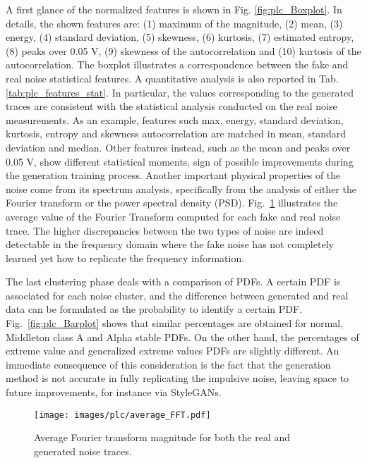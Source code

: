 A first glance of the normalized features is shown in Fig. \ref{fig:plc_Boxplot}. In details, the shown features are: (1) maximum of the magnitude, (2) mean, (3) energy, (4) standard deviation, (5) skewness, (6) kurtosis, (7) estimated entropy, (8) peaks over 0.05 V, (9) skewness of the autocorrelation and (10) kurtosis of the autocorrelation. The boxplot illustrates a correspondence between the fake and real noise statistical features. A quantitative analysis is also reported in Tab. \ref{tab:plc_features_stat}. In particular, the values corresponding to the generated traces are consistent with the statistical analysis conducted on the real noise measurements.
As an example, features such max, energy, standard deviation, kurtosis, entropy and skewness autocorrelation are matched in mean, standard deviation and median. Other features instead, such as the mean and peaks over 0.05 V, show different statistical moments, sign of possible improvements during the generation training process. Another important physical properties of the noise come from its spectrum analysis, specifically from the analysis of either the Fourier transform or the power spectral density (PSD). Fig.~\ref{fig:plc_FFT} illustrates the average value of the Fourier Transform computed for each fake and real noise trace. The higher discrepancies between the two types of noise are indeed detectable in the frequency domain where the fake noise has not completely learned yet how to replicate the frequency information. 

The last clustering phase deals with a comparison of PDFs. A certain PDF is associated for each noise cluster, and the difference between generated and real data can be formulated as the probability to identify a certain PDF. Fig.~\ref{fig:plc_Barplot} shows that similar percentages are obtained for normal, Middleton class A and Alpha stable PDFs. On the other hand, the percentages of extreme value and generalized extreme values PDFs are slightly different. An immediate consequence of this consideration is the fact that the generation method is not accurate in fully replicating the impulsive noise, leaving space to future improvements, for instance via StyleGANs.


\begin{figure}[t]
	\centering
	\texttt{[image: images/plc/average\_FFT.pdf]}
	\caption{Average Fourier transform magnitude for both the real and generated noise traces.}
	\label{fig:plc_FFT}
\end{figure}

